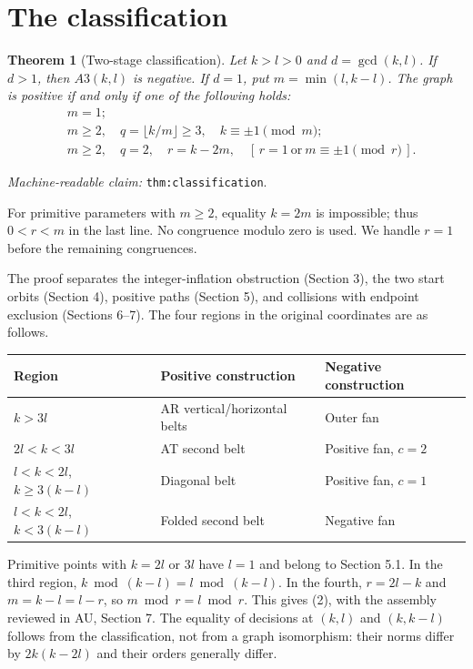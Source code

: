 \documentclass[11pt]{amsart}
\newcommand{\record}[1]{\nolinkurl{#1}}
\newtheorem{theorem}{Theorem}
\newcommand{\claimid}[1]{\par\nopagebreak\noindent\textit{Machine-readable claim:} \record{#1}.\par}
\begin{document}
\section{The classification}\label{sec:classification}
\begin{theorem}[Two-stage classification]\label{thm:classification}
Let $k>l>0$ and $d=\gcd(k,l)$. If $d>1$, then $A3(k,l)$ is negative.
If $d=1$, put $m=\min(l,k-l)$. The graph is positive if and only if
one of the following holds:
\begin{equation}\label{eq:2}
\begin{aligned}
 &m=1;\\
 &m\ge2,\quad q=\lfloor k/m\rfloor\ge3,\quad k\equiv\pm1\pmod m;\\
 &m\ge2,\quad q=2,\quad r=k-2m,\quad
       [\,r=1\ \text{or}\ m\equiv\pm1\pmod r\,].
\end{aligned}\tag{2}
\end{equation}
\end{theorem}
\claimid{thm:classification}
For primitive parameters with $m\ge2$, equality $k=2m$ is impossible;
thus $0<r<m$ in the last line. No congruence modulo zero is used.
We handle $r=1$ before the remaining congruences.

The proof separates the integer-inflation obstruction (Section 3),
the two start orbits (Section 4), positive paths (Section 5), and
collisions with endpoint exclusion (Sections 6--7). The four regions
in the original coordinates are as follows.
\begin{center}\small
\begin{tabular}{lll}\toprule
Region & Positive construction & Negative construction\\\midrule
$k>3l$ & AR vertical/horizontal belts & Outer fan\\
$2l<k<3l$ & AT second belt & Positive fan, $c=2$\\
$l<k<2l$, $k\ge3(k-l)$ & Diagonal belt & Positive fan, $c=1$\\
$l<k<2l$, $k<3(k-l)$ & Folded second belt & Negative fan\\\bottomrule
\end{tabular}\end{center}
Primitive points with $k=2l$ or $3l$ have $l=1$ and belong to
Section 5.1. In the third region, $k\bmod(k-l)=l\bmod(k-l)$.
In the fourth, $r=2l-k$ and $m=k-l=l-r$, so $m\bmod r=l\bmod r$.
This gives (2), with the assembly reviewed in AU, Section 7.
The equality of decisions at $(k,l)$ and $(k,k-l)$ follows from the
classification, not from a graph isomorphism: their norms differ by
$2k(k-2l)$ and their orders generally differ.
\end{document}

